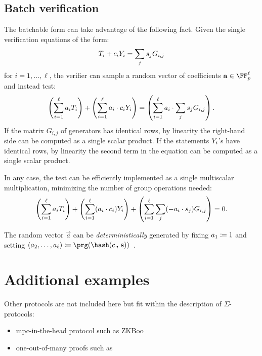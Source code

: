 \documentclass[11pt]{article}
\begin{document}
\subsection{Batch verification}

The batchable form can take advantage of the following fact.
Given the single verification equations of the form:
\[
   T_i + c_i Y_i = \sum_j s_j G_{i,j}
\]
for $i=1, \dots,\ell$,
the verifier can sample a random vector of coefficients $\vec a \in \FF_p^\ell$ and instead test:
\[
  \left(\sum_{i=1}^{\ell} a_i T_i\right) + \left(\sum_{i=1}^{\ell} a_i \cdot  c_i Y_i \right) = \left(\sum_{i=1}^{\ell} a_i \cdot \sum_j s_j G_{i,j}\right).
\]
If the matrix $G_{i, j}$ of generators has identical rows, by linearity the right-hand side can be computed as a single scalar product.
If the statements $Y_i$'s have identical rows, by linearity the second term in the equation can be computed as a single scalar product.

In any case, the test can be efficiently implemented as a single multiscalar multiplication, minimizing the number of group operations needed:
\[
  \left(\sum_{i=1}^{\ell} a_i T_i\right) + \left(\sum_{i=1}^{\ell} (a_i \cdot  c_i) Y_i \right) + \left(\sum_{i=1}^{\ell}\sum_j (-a_i \cdot  s_j) G_{i,j}\right) = 0.
\]

The random vector $\vec a$ can be \emph{deterministically} generated by fixing $a_1 \coloneqq 1$ and setting $(a_2, \dots, a_{\ell}) \defeq \prg(\hash(\challenge \concat \vec s))$~\cite{bip-schnorr}.

\section{Additional examples}

Other protocols are not included here but fit within the description
of $\Sigma$-protocols:
\begin{itemize}
\item mpc-in-the-head protocol such as ZKBoo~\cite{USENIX:GiaMadOrl16}
\item one-out-of-many proofs such as~\cite{EC:GroKoh15}
\end{itemize}
\end{document}

